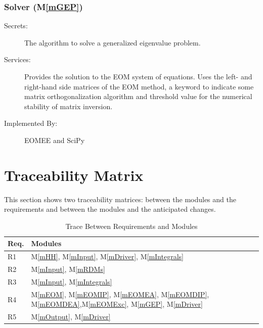 \documentclass[12pt, titlepage]{article}
\newcommand{\mref}[1]{M\ref{#1}}
\begin{document}
\subsubsection{Solver (\mref{mGEP})}

\begin{description}
	\item[Secrets:] The algorithm to solve a generalized eigenvalue problem.
	\item[Services:] Provides the solution to the EOM system of equations. Uses 
	the left- and right-hand side matrices of the EOM method, a keyword to 
	indicate some matrix orthogonalization algorithm and threshold value for 
	the numerical stability of matrix inversion.
	\item[Implemented By:] EOMEE and SciPy
\end{description}

\section{Traceability Matrix} \label{SecTM}

This section shows two traceability matrices: between the modules and the
requirements and between the modules and the anticipated changes.

\begin{table}[H]
\centering
\begin{tabular}{p{} p{}}
\toprule
\textbf{Req.} & \textbf{Modules}\\
\midrule
R1 & \mref{mHH}, \mref{mInput}, \mref{mDriver}, \mref{mIntegrals}\\
R2 & \mref{mInput}, \mref{mRDMs}\\
R3 & \mref{mInput}, \mref{mIntegrals}\\
R4 & \mref{mEOM}, \mref{mEOMIP}, \mref{mEOMEA}, \mref{mEOMDIP}, 
\mref{mEOMDEA},\mref{mEOMExc}, \mref{mGEP}, \mref{mDriver}\\
R5 & \mref{mOutput}, \mref{mDriver}\\
\bottomrule
\end{tabular}
\caption{Trace Between Requirements and Modules}
\label{TblRT}
\end{table}
\end{document}
